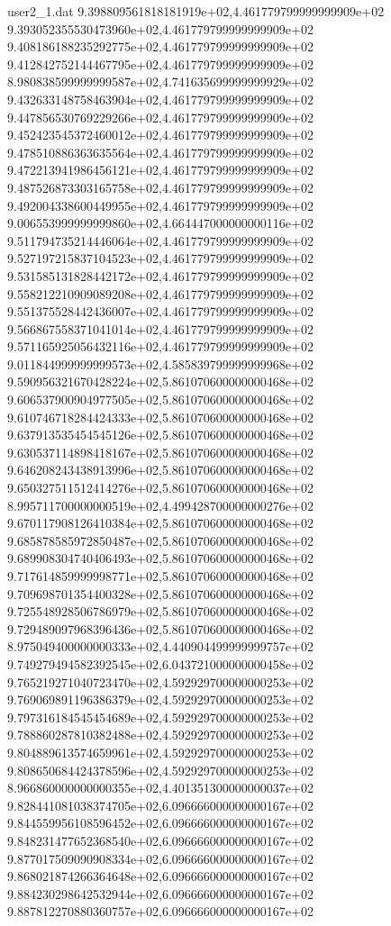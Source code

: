 \begin{filecontents}{user2_1.dat}
9.398809561818181919e+02,4.461779799999999909e+02
9.393052355530473960e+02,4.461779799999999909e+02
9.408186188235292775e+02,4.461779799999999909e+02
9.412842752144467795e+02,4.461779799999999909e+02
8.980838599999999587e+02,4.741635699999999929e+02
9.432633148758463904e+02,4.461779799999999909e+02
9.447856530769229266e+02,4.461779799999999909e+02
9.452423545372460012e+02,4.461779799999999909e+02
9.478510886363635564e+02,4.461779799999999909e+02
9.472213941986456121e+02,4.461779799999999909e+02
9.487526873303165758e+02,4.461779799999999909e+02
9.492004338600449955e+02,4.461779799999999909e+02
9.006553999999999860e+02,4.664447000000000116e+02
9.511794735214446064e+02,4.461779799999999909e+02
9.527197215837104523e+02,4.461779799999999909e+02
9.531585131828442172e+02,4.461779799999999909e+02
9.558212210909089208e+02,4.461779799999999909e+02
9.551375528442436007e+02,4.461779799999999909e+02
9.566867558371041014e+02,4.461779799999999909e+02
9.571165925056432116e+02,4.461779799999999909e+02
9.011844999999999573e+02,4.585839799999999968e+02
9.590956321670428224e+02,5.861070600000000468e+02
9.606537900904977505e+02,5.861070600000000468e+02
9.610746718284424333e+02,5.861070600000000468e+02
9.637913535454545126e+02,5.861070600000000468e+02
9.630537114898418167e+02,5.861070600000000468e+02
9.646208243438913996e+02,5.861070600000000468e+02
9.650327511512414276e+02,5.861070600000000468e+02
8.995711700000000519e+02,4.499428700000000276e+02
9.670117908126410384e+02,5.861070600000000468e+02
9.685878585972850487e+02,5.861070600000000468e+02
9.689908304740406493e+02,5.861070600000000468e+02
9.717614859999998771e+02,5.861070600000000468e+02
9.709698701354400328e+02,5.861070600000000468e+02
9.725548928506786979e+02,5.861070600000000468e+02
9.729489097968396436e+02,5.861070600000000468e+02
8.975049400000000333e+02,4.440904499999999757e+02
9.749279494582392545e+02,6.043721000000000458e+02
9.765219271040723470e+02,4.592929700000000253e+02
9.769069891196386379e+02,4.592929700000000253e+02
9.797316184545454689e+02,4.592929700000000253e+02
9.788860287810382488e+02,4.592929700000000253e+02
9.804889613574659961e+02,4.592929700000000253e+02
9.808650684424378596e+02,4.592929700000000253e+02
8.966860000000000355e+02,4.401351300000000037e+02
9.828441081038374705e+02,6.096666000000000167e+02
9.844559956108596452e+02,6.096666000000000167e+02
9.848231477652368540e+02,6.096666000000000167e+02
9.877017509090908334e+02,6.096666000000000167e+02
9.868021874266364648e+02,6.096666000000000167e+02
9.884230298642532944e+02,6.096666000000000167e+02
9.887812270880360757e+02,6.096666000000000167e+02

\end{filecontents}

